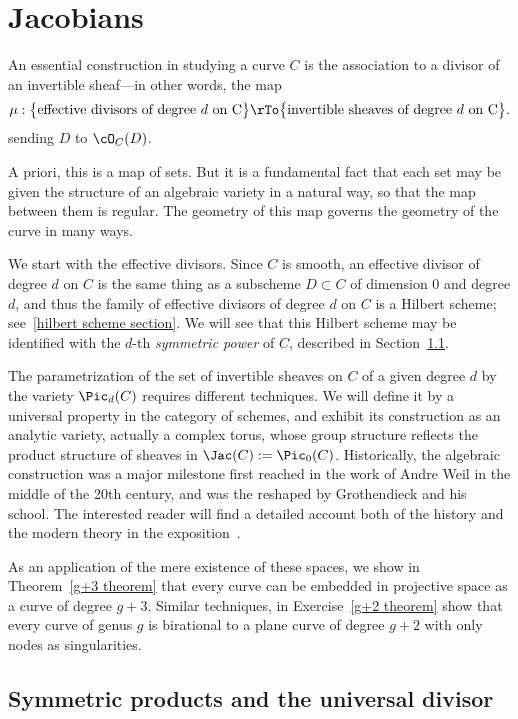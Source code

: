 

\chapter{Jacobians}\label{new Jacobians chapter}


An essential construction in studying a curve $C$ is the association to a divisor  of an invertible sheaf---in other words, the map
$$
\mu : \big\{ \text{effective divisors of degree $d$ on C}\big\} \rTo \big\{ \text{invertible sheaves of degree $d$ on C} \big\}.
$$
sending $D$ to $\cO_C(D)$.

A priori, this is a map of sets. But it is a fundamental fact that each set may  be given the structure of an algebraic variety in a natural way, so that the map between them is regular. The geometry of this map governs the geometry of the curve in many ways.

We start with the effective divisors. Since $C$ is smooth, an effective divisor of degree $d$ on $C$ is the same thing as a subscheme $D \subset C$ of dimension 0 and degree $d$, and thus
the family of effective divisors of degree $d$ on $C$ is a Hilbert scheme; see~\ref{hilbert scheme section}. We will see that this Hilbert scheme may be identified with
the $d$-th \emph{symmetric power}  of $C$, described in Section~\ref{symmetric section}. 

The parametrization of the set of invertible sheaves on $C$ of a given degree $d$ by the variety $\Pic_d(C)$ requires different techniques. We will define it by a universal property in the category of schemes, and exhibit its construction as an analytic variety, actually a complex torus, whose group structure reflects the product structure of
sheaves in $\Jac(C) := \Pic_0(C)$.
Historically, the algebraic construction was a major milestone first reached in the work of Andre Weil in the middle of
the 20th century, and was the reshaped by Grothendieck and his school. The interested reader will find a detailed account both of the history and the 
modern theory in the exposition~\cite{Kleiman-PicardScheme}.

As an application of the mere existence of these spaces, we show in Theorem~\ref{g+3 theorem} that every curve can be embedded in projective space as a curve of degree $g+3$. Similar techniques, in Exercise~\ref{g+2 theorem} show that every curve of genus $g$ is birational to a plane curve of degree $g+2$ with only nodes
as singularities.

\section{Symmetric products and the universal divisor}\label{symmetric section}

